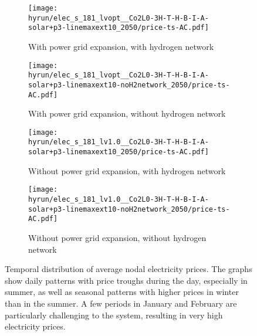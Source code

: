 \begin{figure}
    \begin{subfigure}{0.49\textwidth}
        \centering
        \caption{With power grid expansion, with hydrogen network}
        \texttt{[image: \\hyrun/elec\_s\_181\_lvopt\_\_Co2L0-3H-T-H-B-I-A-solar+p3-linemaxext10\_2050/price-ts-AC.pdf]}
    \end{subfigure}
    \begin{subfigure}{0.49\textwidth}
        \centering
        \caption{With power grid expansion, without hydrogen network}
        \texttt{[image: \\hyrun/elec\_s\_181\_lvopt\_\_Co2L0-3H-T-H-B-I-A-solar+p3-linemaxext10-noH2network\_2050/price-ts-AC.pdf]}
    \end{subfigure}
    \begin{subfigure}{0.49\textwidth}
        \centering
        \caption{Without power grid expansion, with hydrogen network}
        \texttt{[image: \\hyrun/elec\_s\_181\_lv1.0\_\_Co2L0-3H-T-H-B-I-A-solar+p3-linemaxext10\_2050/price-ts-AC.pdf]}
    \end{subfigure}
    \begin{subfigure}{0.49\textwidth}
        \centering
        \caption{Without power grid expansion, without hydrogen network}
        \texttt{[image: \\hyrun/elec\_s\_181\_lv1.0\_\_Co2L0-3H-T-H-B-I-A-solar+p3-linemaxext10-noH2network\_2050/price-ts-AC.pdf]}
    \end{subfigure}
    \caption{Temporal distribution of average nodal electricity prices. The graphs show daily patterns with price troughs during the day, especially in summer, as well as seasonal patterns with higher prices in winter than in the summer. A few periods in January and February are particularly challenging to the system, resulting in very high electricity prices.}
    \label{fig:si:lmp-ts-ac}
\end{figure}

